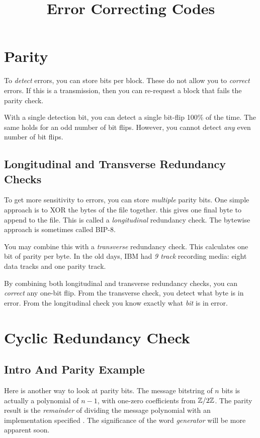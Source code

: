 \documentclass[11pt, oneside]{amsart}
\begin{document}
\title{Error Correcting Codes}
\maketitle

\section{Parity}

To \emph{detect} errors, you can store  bits per block.
These do not allow you to \emph{correct} errors. If this is a
transmission, then you can re-request a block that fails the parity
check.

With a single detection bit, you can detect a single bit-flip 100\% of
the time. The same holds for an odd number of bit flips. However, you
cannot detect \emph{any} even number of bit flips.

\subsection{Longitudinal and Transverse Redundancy Checks}

To get more sensitivity to errors, you can store \emph{multiple} parity
bits. One simple approach is to XOR the bytes of the file together. this
gives one final byte to append to the file. This is called a
\emph{longitudinal} redundancy check. The bytewise approach is sometimes
called BIP-8.

You may combine this with a \emph{transverse} redundancy check. This
calculates one bit of parity per byte. In the old days, IBM had \emph{9
track} recording media: eight data tracks and one parity track.

By combining both longitudinal and transverse redundancy checks, you can
\emph{correct} any one-bit flip. From the transverse check, you detect
what byte is in error. From the longitudinal check you know exactly what
\emph{bit} is in error.

\section{Cyclic Redundancy Check}

\subsection{Intro And Parity Example}

Here is another way to look at parity bits. The message bitstring of $n$
bits is actually a polynomial of $n-1$, with one-zero coefficients from
$\mathbb{Z} / 2\mathbb{Z}$. The parity result is the \emph{remainder} of dividing the
message polynomial with an implementation specified . The significance of the word \emph{generator} will be more
apparent soon.
\end{document}
